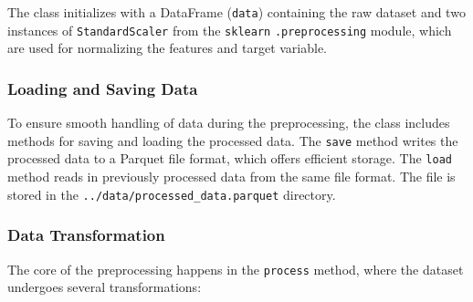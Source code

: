The class initializes with a DataFrame (\texttt{data}) containing the raw dataset and two instances of
\texttt{StandardScaler} from the \texttt{sklearn} \texttt{.preprocessing} module, which are used for normalizing
the features and target variable.

\subsubsection{Loading and Saving Data}

To ensure smooth handling of data during the preprocessing, the class includes methods for saving and loading the
processed data. The \texttt{save} method writes the processed data to a Parquet file format, which offers efficient
storage. The \texttt{load} method reads in previously processed data from the same file format. The file is stored in
the \texttt{../data/processed\_data.parquet} directory.

\subsubsection{Data Transformation}

The core of the preprocessing happens in the \texttt{process} method, where the dataset undergoes several transformations:

